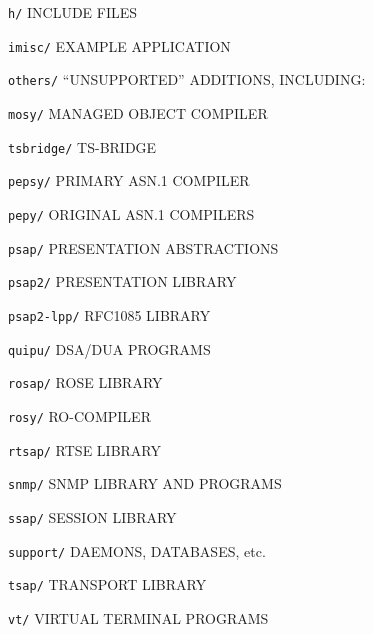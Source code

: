 \begin{bwslide}

\begin{nrtc}
\item	\verb"h/" INCLUDE FILES

\item	\verb"imisc/" EXAMPLE APPLICATION

\item	\verb"others/" ``UNSUPPORTED'' ADDITIONS, INCLUDING:
    \begin{nrtc}
    \item	\verb"mosy/" MANAGED OBJECT COMPILER

    \item	\verb"tsbridge/" TS-BRIDGE
    \end{nrtc}

\item	\verb"pepsy/" PRIMARY ASN.1 COMPILER

\item	\verb"pepy/" ORIGINAL ASN.1 COMPILERS

\item	\verb"psap/" PRESENTATION ABSTRACTIONS

\item	\verb"psap2/" PRESENTATION LIBRARY

\item	\verb"psap2-lpp/" RFC1085 LIBRARY
\end{nrtc}
\end{bwslide}


\begin{bwslide}

\begin{nrtc}
\item	\verb"quipu/" DSA/DUA PROGRAMS

\item	\verb"rosap/" ROSE LIBRARY

\item	\verb"rosy/" RO-COMPILER

\item	\verb"rtsap/" RTSE LIBRARY

\item	\verb"snmp/" SNMP LIBRARY AND PROGRAMS

\item	\verb"ssap/" SESSION LIBRARY

\item	\verb"support/" DAEMONS, DATABASES, etc.

\item	\verb"tsap/" TRANSPORT LIBRARY

\item	\verb"vt/" VIRTUAL TERMINAL PROGRAMS
\end{nrtc}
\end{bwslide}


